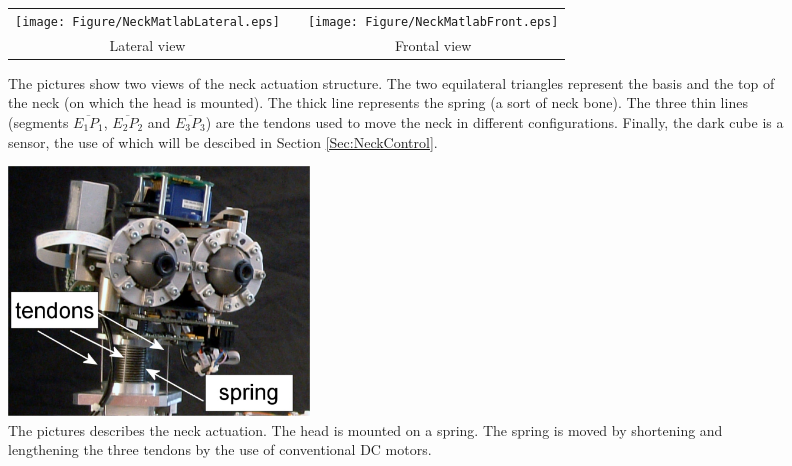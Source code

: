 \begin{figure}
 \begin{center}
	\begin{tabular}{ccc}
	  \parbox{40mm}{\texttt{[image: Figure/NeckMatlabLateral.eps]}}  & \hspace{2cm} &
	  \parbox{40mm}{\texttt{[image: Figure/NeckMatlabFront.eps]}}
	  \\
	  Lateral view & \hspace{2cm} & Frontal view
  \end{tabular}
\end{center}
\caption{The pictures show two views of the neck actuation structure. The two equilateral triangles represent the basis and the top of the neck (on which the head is mounted). The thick line represents the spring (a sort of neck bone). The three thin lines (segments $\overline{E_1 P_1}$, $\overline{E_2 P_2}$ and $\overline{E_3 P_3}$) are the tendons used to move the neck in different configurations. Finally, the dark cube is a sensor, the use of which will be descibed in Section \ref{Sec:NeckControl}.}
\label{Fig:NeckFrontLat}
\end{figure}

\begin{figure}
\centering
\includegraphics[width=80mm]{Figure/Head.eps}
\caption{The pictures describes the neck actuation. The head is mounted on a spring. The spring is moved by shortening and lengthening the three tendons by the use of conventional DC motors.}
\label{Fig:Head}
\end{figure}

